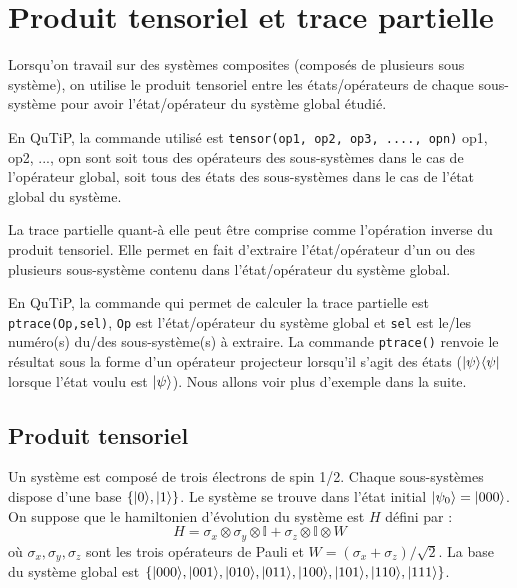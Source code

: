 \section{Produit tensoriel et trace partielle}

Lorsqu'on travail sur des systèmes composites (composés de plusieurs sous système), on utilise le produit tensoriel entre les états/opérateurs de chaque sous-système pour avoir l'état/opérateur du système global étudié.

En QuTiP, la commande utilisé est \texttt{tensor(op1, op2, op3, ...., opn)} op1, op2, ..., opn sont soit tous des opérateurs des sous-systèmes dans le cas de l'opérateur global, soit tous des états des sous-systèmes dans le cas de l'état global du système.

La trace partielle quant-à elle peut être comprise comme l'opération inverse du produit tensoriel. Elle permet en fait d'extraire l'état/opérateur d'un ou des plusieurs sous-système contenu dans l'état/opérateur du système global.

En QuTiP, la commande qui permet de calculer la trace partielle est \texttt{ptrace(Op,sel)}, \texttt{Op} est l'état/opérateur du système global et \texttt{sel} est le/les numéro(s) du/des sous-système(s) à extraire. La commande \texttt{ptrace()} renvoie le résultat sous la forme d'un opérateur projecteur lorsqu'il s'agit des états ($\vert\psi\rangle\langle\psi\vert$ lorsque l'état voulu est $\vert\psi\rangle$). Nous allons voir plus d'exemple dans la suite.
\subsection{Produit tensoriel} \label{tensor}
Un système est composé de trois électrons de spin 1/2. Chaque sous-systèmes dispose d'une base $\{\vert0\rangle,\vert1\rangle\}$. Le système se trouve dans l'état initial $\vert\psi_0\rangle=\vert000\rangle$. On suppose que le hamiltonien d'évolution du système est $H$ défini par :
\begin{equation}
H = \sigma_x\otimes\sigma_y\otimes\mathbb{I}+\sigma_z\otimes\mathbb{I}\otimes W
\end{equation}
où $\sigma_x,\sigma_y,\sigma_z$ sont les trois opérateurs de Pauli et $W=(\sigma_x+\sigma_z)/\sqrt{2}$. La base du système global est $\{\vert000\rangle,\vert001\rangle,\vert010\rangle,\vert011\rangle,\vert100\rangle,\vert101\rangle,\vert110\rangle,\vert111\rangle\}$.

